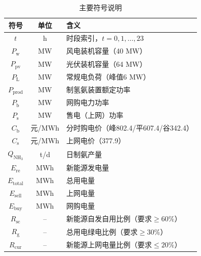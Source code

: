 \begin{table}[H]
\caption{主要符号说明}
\label{tab:notation}
\centering
\begin{tabular*}{\textwidth}{@{\extracolsep{\fill}}ccl}
\toprule[1.5pt]
符号 & 单位 & 含义 \\
\midrule[1pt]
$t$ & h & 时段索引，$t=0,1,\ldots,23$ \\
$P_{\mathrm{w}}$ & MW & 风电装机容量（40 MW） \\
$P_{\mathrm{pv}}$ & MW & 光伏装机容量（64 MW） \\
$P_{\mathrm{L}}$ & MW & 常规电负荷（峰值6 MW） \\
$P_{\mathrm{prod}}$ & MW & 制氢氨装置额定功率 \\
$P_{\mathrm{b}}$ & MW & 网购电力功率 \\
$P_{\mathrm{s}}$ & MW & 售电（上网）功率 \\
$C_{\mathrm{b}}$ & 元/MWh & 分时购电价（峰802.4/平607.4/谷342.4） \\
$C_{\mathrm{s}}$ & 元/MWh & 上网电价（377.9） \\
$Q_{\mathrm{NH_3}}$ & t/d & 日制氨产量 \\
$E_{\mathrm{re}}$ & MWh & 新能源发电量 \\
$E_{\mathrm{total}}$ & MWh & 总用电量 \\
$E_{\mathrm{sell}}$ & MWh & 上网电量 \\
$E_{\mathrm{buy}}$ & MWh & 网购电量 \\
$R_{\mathrm{sc}}$ & -- & 新能源自发自用比例（要求$\ge 60\%$） \\
$R_{\mathrm{g}}$ & -- & 总用电绿电比例（要求$\ge 30\%$） \\
$R_{\mathrm{cur}}$ & -- & 新能源上网电量比例（要求$\le 20\%$） \\
\bottomrule[1.5pt]
\end{tabular*}
\end{table}


